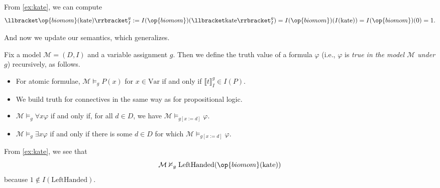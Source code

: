 \documentclass[../notes.tex]{subfiles}
\begin{document}
\begin{example}
	From \autoref{ex:kate}, we can compute
	\[\llbracket\op{biomom}(\mathrm{kate})\rrbracket_I^g:=I(\op{biomom})(\llbracket \mathrm{kate}\rrbracket_I^g)=I(\op{biomom})(I(\mathrm{kate}))=I(\op{biomom})(0)=1.\]
\end{example}
And now we update our semantics, which generalizes.
\begin{defihelper}[Truth]
	Fix a model $\mathcal M=(D,I)$ and a variable assignment $g$. Then we define the truth value of a formula $\varphi$ (i.e., $\varphi$ is \textit{true in the model $\mathcal M$ under $g$}) recursively, as follows.
	\begin{itemize}
		\item For atomic formulae, $\mathcal M\models_gP(x)$ for $x\in\mathrm{Var}$ if and only if $\llbracket t\rrbracket_I^g\in I(P)$.
		\item We build truth for connectives in the same way as for propositional logic.
		\item $\mathcal M\models_g\forall x\varphi$ if and only if, for all $d\in D$, we have $\mathcal M\models_{g[x:=d]}\varphi$.
		\item $\mathcal M\models_g\exists x\varphi$ if and only if there is some $d\in D$ for which $\mathcal M\models_{g[x:=d]}\varphi$.
	\end{itemize}
\end{defihelper}
\begin{example}
	From \autoref{ex:kate}, we see that
	\[\mathcal M\nvDash_g\mathrm{LeftHanded}(\op{biomom}(\mathrm{kate}))\]
	because $1\notin I(\mathrm{LeftHanded})$.
\end{example}
\end{document}
